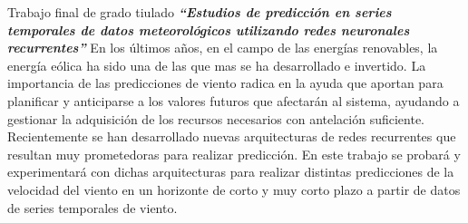 
\vspace{1\baselineskip}
Trabajo final de grado tiulado \textbf{\textit{“Estudios de predicción en series temporales de datos meteorológicos utilizando redes neuronales recurrentes” }}\cite{montesdeoca2016estudios} En los últimos años, en el campo de las energías renovables, la energía eólica ha sido una de las que mas se ha desarrollado e invertido. La importancia de las predicciones de viento radica en la ayuda que aportan para planificar y anticiparse a los valores futuros que afectarán al sistema, ayudando a gestionar la adquisición de los recursos necesarios con antelación suficiente. Recientemente se han desarrollado nuevas arquitecturas de redes recurrentes que resultan muy prometedoras para realizar predicción. En este trabajo se probará y experimentará con dichas arquitecturas para realizar distintas predicciones de la velocidad del viento en un horizonte de corto y muy corto plazo a partir de datos de series temporales de viento.

